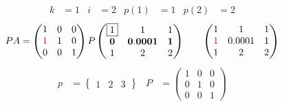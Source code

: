\documentclass[pdf]{beamer}
\begin{document}
\begin{frame}{}\begin{align*} k &= 1 & i &= 2 & p(1) &= 1 & p(2) &= 2\end{align*}$$PA=\begin{pmatrix}1&0&0\\{\color{red}1}&1&0\\0&0&1\end{pmatrix} P \begin{pmatrix}\boxed{1}&1&1\\\mathbf{0}&\mathbf{0.0001}&\mathbf{1}\\1&2&2\end{pmatrix} \quad\quad \begin{pmatrix}1&1&1\\{\color{purple}1}&0.0001&1\\1&2&2\end{pmatrix}$$\begin{align*} p&= \begin{Bmatrix}1&2&3\end{Bmatrix} & P&= \begin{pmatrix}1&0&0\\0&1&0\\0&0&1\end{pmatrix} \end{align*}\end{frame}
\end{document}

